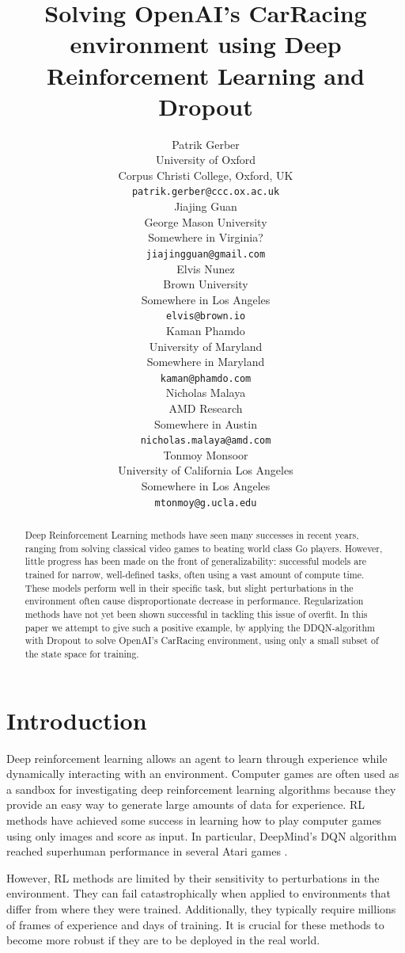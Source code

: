 \documentclass{article}
\title{Solving OpenAI's CarRacing environment using Deep Reinforcement Learning and Dropout}
\author{
  Patrik Gerber \\
  University of Oxford \\
  Corpus Christi College, Oxford, UK \\
  \texttt{patrik.gerber@ccc.ox.ac.uk} \\
  \And
  Jiajing Guan \\
  George Mason University \\ 
  Somewhere in Virginia? \\
  \texttt{jiajingguan@gmail.com} \\
  \And
  Elvis Nunez \\
  Brown University \\
  Somewhere in Los Angeles \\
  \texttt{elvis@brown.io} \\
  \And
  Kaman Phamdo \\
  University of Maryland \\
  Somewhere in Maryland \\
  \texttt{kaman@phamdo.com} \\
  \And
  Nicholas Malaya \\
  AMD Research \\ 
  Somewhere in Austin \\
  \texttt{nicholas.malaya@amd.com} \\
  \And
  Tonmoy Monsoor \\
  University of California Los Angeles \\
  Somewhere in Los Angeles \\
  \texttt{mtonmoy@g.ucla.edu} \\
}
\begin{document}

\maketitle

\begin{abstract}
Deep Reinforcement Learning methods have seen many successes in recent years, ranging from solving classical video games to beating 
world class Go players. However, little progress has been made on the front of generalizability: successful models are trained for 
narrow, well-defined tasks, often using a vast amount of compute time. These models perform well in their specific task, but slight 
perturbations in the environment often cause disproportionate decrease in performance. Regularization methods have not yet been shown 
successful in tackling this issue of overfit. In this paper we attempt to give such a positive example, by applying the DDQN-algorithm 
with Dropout to solve OpenAI's CarRacing environment, using only a small subset of the state space for training. 
\end{abstract}

\section{Introduction}

Deep reinforcement learning allows an agent to learn through experience while
dynamically interacting with an environment. Computer games are often used as
a sandbox for investigating deep reinforcement learning algorithms because they
provide an easy way to generate large amounts of data for experience. RL
methods have achieved some success in learning how to play computer games using
only images and score as input. In particular, DeepMind’s DQN algorithm reached
superhuman performance in several Atari games \cite{DQNPaper}.

However, RL methods are limited by their sensitivity to perturbations in the
environment. They can fail catastrophically when applied to environments that
differ from where they were trained. Additionally, they typically require
millions of frames of experience and days of training. It is crucial for these
methods to become more robust if they are to be deployed in the real world.
\end{document}
